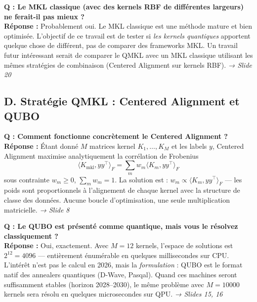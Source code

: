 \documentclass[12pt, a4paper]{article}
\begin{document}
\begin{question}
\textbf{Q : Le MKL classique (avec des kernels RBF de différentes largeurs) ne ferait-il pas mieux ?}\\[4pt]
\textbf{Réponse :} Probablement oui. Le MKL classique est une méthode mature et bien optimisée.
L'objectif de ce travail est de tester si \emph{les kernels quantiques} apportent
quelque chose de différent, pas de comparer des frameworks MKL.
Un travail futur intéressant serait de comparer le QMKL avec un MKL classique
utilisant les mêmes stratégies de combinaison (Centered Alignment sur kernels RBF).
\hfill\textit{→ Slide 20}
\end{question}

\subsection*{D. Stratégie QMKL : Centered Alignment et QUBO}

\begin{question}
\textbf{Q : Comment fonctionne concrètement le Centered Alignment ?}\\[4pt]
\textbf{Réponse :} Étant donné $M$ matrices kernel $K_1, \ldots, K_M$ et les labels $y$,
Centered Alignment maximise analytiquement la corrélation de Frobenius
$$\langle K_{\text{mkl}}, yy^\top \rangle_F = \sum_m w_m \langle K_m, yy^\top \rangle_F$$
sous contrainte $w_m \geq 0$, $\sum_m w_m = 1$.
La solution est : $w_m \propto \langle K_m, yy^\top \rangle_F$ — les poids sont proportionnels
à l'alignement de chaque kernel avec la structure de classe des données.
Aucune boucle d'optimisation, une seule multiplication matricielle.
\hfill\textit{→ Slide 8}
\end{question}

\begin{question}
\textbf{Q : Le QUBO est présenté comme quantique, mais vous le résolvez classiquement ?}\\[4pt]
\textbf{Réponse :} Oui, exactement. Avec $M=12$ kernels, l'espace de solutions est $2^{12} = 4096$ —
entièrement énumérable en quelques millisecondes sur CPU.
L'intérêt n'est pas le calcul en 2026, mais la \emph{formulation} :
QUBO est le format natif des annealers quantiques (D-Wave, Pasqal).
Quand ces machines seront suffisamment stables (horizon 2028--2030),
le même problème avec $M=10000$ kernels sera résolu en quelques microsecondes sur QPU.
\hfill\textit{→ Slides 15, 16}
\end{question}
\end{document}
